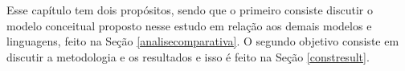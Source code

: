 Esse capítulo tem dois propósitos, sendo que o primeiro consiste discutir o modelo conceitual proposto nesse estudo em relação aos demais modelos e linguagens, feito na Seção  \ref{analisecomparativa}. O segundo objetivo consiste em discutir a metodologia e os resultados e isso é feito na Seção \ref{constresult}.